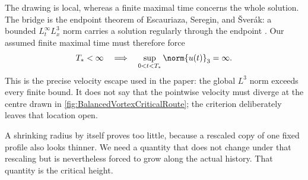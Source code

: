 The drawing is local, whereas a finite maximal time concerns the whole
solution.  The bridge is the endpoint theorem of Escauriaza, Seregin, and
\v{S}ver\'ak: a bounded \(L^\infty_tL^3_x\) norm carries a solution regularly
through the endpoint \parencite{EscauriazaSereginSverak2003}.  Our assumed
finite maximal time must therefore force
\begin{equation}\label{eq:FiniteTimeLThreeEscape}
  T_*<\infty
  \quad\Longrightarrow\quad
  \sup_{0<t<T_*}\norm{u(t)}_3=\infty.
\end{equation}
This is the precise velocity escape used in the paper: the global \(L^3\)
norm exceeds every finite bound.  It does not say that the pointwise velocity
must diverge at the centre drawn in
\cref{fig:BalancedVortexCriticalRoute}; the criterion deliberately leaves that
location open.

A shrinking radius by itself proves too little, because a rescaled copy of one
fixed profile also looks thinner.  We need a quantity that does not change
under that rescaling but is nevertheless forced to grow along the actual
history.  That quantity is the critical height.
